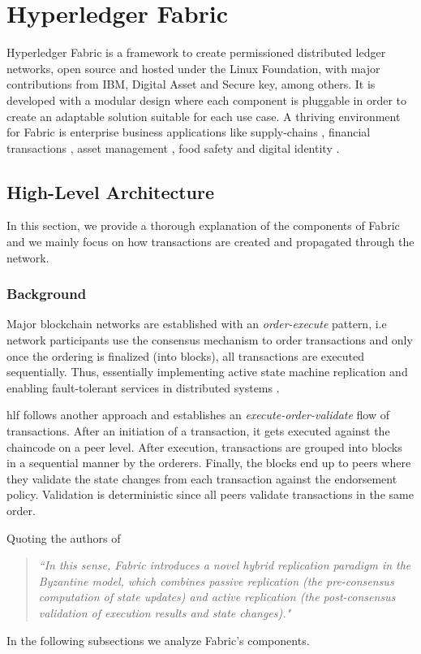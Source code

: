 \chapter{Hyperledger Fabric}
\label{ch:Fabric}
Hyperledger Fabric \cite{androulaki2018hyperledger} is a framework to create permissioned distributed ledger networks, open source and hosted under the Linux Foundation, with major contributions from IBM, Digital Asset and Secure key, among others. It is developed with a modular design where each component is pluggable in order to create an adaptable solution suitable for each use case. A thriving environment for Fabric is enterprise business applications like supply-chains \cite{tradelens}, financial transactions \cite{we-trade}, asset management \cite{worldwire}, food safety \cite{foodtrust} and digital identity \cite{digitalid}.
\section{High-Level Architecture}
In this section, we provide a thorough explanation of the components of Fabric and we mainly focus on how transactions are created and propagated through the network.
\subsection{Background}
Major blockchain networks are established with an \textit{order-execute} pattern, i.e network participants use the consensus mechanism to order transactions and only once the ordering is finalized (into blocks), all transactions are executed sequentially. Thus, essentially implementing active state machine replication and enabling fault-tolerant services in distributed systems \cite{schneider1990implementing}.

\acrfull{hlf} follows another approach and establishes an \textit{execute-order-validate} flow of transactions. After an initiation of a transaction, it gets executed against the chaincode on a peer level. After execution, transactions are grouped into blocks in a sequential manner by the orderers. Finally, the blocks end up to peers where they validate the state changes from each transaction against the endorsement policy. Validation is deterministic since all peers validate transactions in the same order.

Quoting the authors of \cite{androulaki2018hyperledger} 
\begin{quote}
    \textit{``In this sense, Fabric introduces a novel hybrid replication paradigm in the Byzantine model, which combines passive replication (the pre-consensus computation of state updates) and active replication (the post-consensus validation of execution results and state changes)."}
\end{quote}
In the following subsections we analyze Fabric's components.
